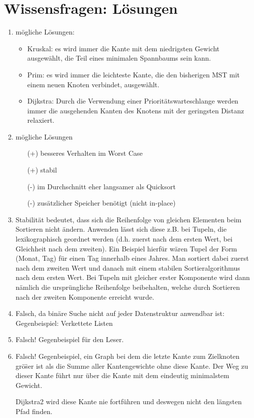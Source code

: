 \documentclass{scrartcl}
\begin{document}
\section*{Wissensfragen: Lösungen}
\begin{enumerate}[(1)]

\item mögliche Lösungen:
\begin{itemize}
\item Kruskal: es wird immer die Kante mit dem niedrigsten Gewicht ausgewählt, die Teil eines minimalen Spannbaums sein kann.
\item Prim: es wird immer die leichteste Kante, die den bisherigen MST mit einem neuen Knoten verbindet, ausgewählt.
\item Dijkstra: Durch die Verwendung einer Prioritätswarteschlange werden immer die ausgehenden Kanten des Knotens mit der geringsten Distanz relaxiert.
\end{itemize}

\item mögliche Lösungen
\begin{itemize}
\item[(+)] besseres Verhalten im Worst Case
\item[(+)] stabil
\item[(-)] im Durchschnitt eher langsamer als Quicksort
\item[(-)] zusätzlicher Speicher benötigt (nicht in-place)
\end{itemize}

\item Stabilität bedeutet, dass sich die Reihenfolge von gleichen Elementen beim Sortieren nicht ändern. Anwenden lässt sich diese z.B. bei Tupeln, die lexikographisch geordnet werden (d.h. zuerst nach dem ersten Wert, bei Gleichheit nach dem zweiten). Ein Beispiel hierfür wären Tupel der Form (Monat, Tag) für einen Tag innerhalb eines Jahres. Man sortiert dabei zuerst nach dem zweiten Wert und danach mit einem stabilen Sortieralgorithmus nach dem ersten Wert. Bei Tupeln mit gleicher erster Komponente wird dann nämlich die ursprüngliche Reihenfolge beibehalten, welche durch Sortieren nach der zweiten Komponente erreicht wurde.

\item Falsch, da bin\"are Suche nicht auf jeder Datenstruktur anwendbar ist: Gegenbeispiel: Verkettete Listen

\item Falsch! Gegenbeispiel f\"ur den Leser.

\item Falsch! Gegenbeispiel, ein Graph bei dem die letzte Kante zum Zielknoten gr\"o\"ser ist als die Summe aller Kantengewichte ohne diese Kante. 
Der Weg zu dieser Kante f\"uhrt nur \"uber die Kante mit dem eindeutig minimalstem Gewicht.

Dijkstra2 wird diese Kante nie fortf\"uhren und deswegen nicht den l\"angsten Pfad finden.


\end{enumerate}
\end{document}

